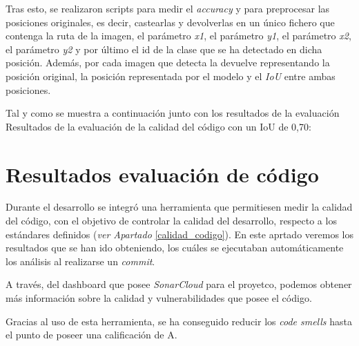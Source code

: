 Tras esto, se realizaron scripts para medir el \textit{accuracy} y para preprocesar las posiciones originales, es decir, castearlas y devolverlas en un único fichero que contenga la ruta de la imagen, el parámetro \textit{x1}, el parámetro \textit{y1}, el parámetro \textit{x2}, el parámetro \textit{y2} y por último el id de la clase que se ha detectado en dicha posición.
Además, por cada imagen que detecta la devuelve representando la posición original, la posición representada por el modelo y el \textit{IoU} entre ambas posiciones.

\clearpage

Tal y como se muestra a continuación junto con los resultados de la evaluación
Resultados de la evaluación de la calidad del código con un IoU de 0,70:


\section{Resultados evaluación de código} 
Durante el desarrollo se integró una herramienta que permitiesen medir la calidad del código, con el objetivo de controlar la calidad del desarrollo, respecto a los estándares definidos (\textit{ver Apartado }\ref{calidad_codigo}).
En este aprtado veremos los resultados que se han ido obteniendo, los cuáles se ejecutaban automáticamente los análisis al realizarse un \textit{commit}.


\clearpage

A través, del dashboard que posee \textit{SonarCloud} para el proyetco, podemos obtener más información sobre la calidad y vulnerabilidades que posee el código.



Gracias al uso de esta herramienta, se ha conseguido reducir los \textit{code smells} hasta el punto de poseer una calificación de A.